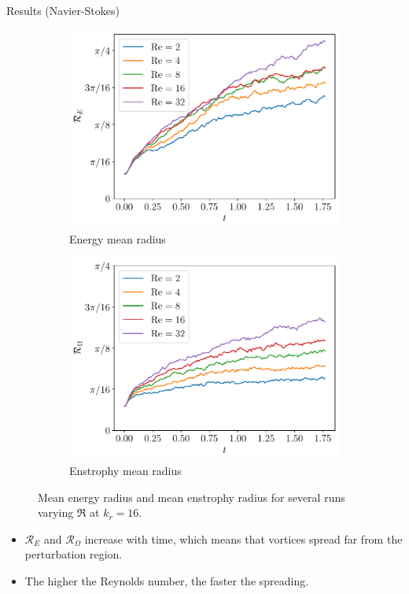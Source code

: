 \documentclass{beamer} %
\begin{document}
\begin{frame}{Results (Navier-Stokes)}
	\begin{figure}[ht]
		\centering
		\begin{subfigure}{0.44\textwidth}
			\centering
			\includegraphics[width=\textwidth]{../images/EnergyMeanRadius_Re.kdn16.pdf}
			\caption{Energy mean radius}
		\end{subfigure}\hspace{0.04\textwidth}
		\begin{subfigure}{0.44\textwidth}
			\centering
			\includegraphics[width=\textwidth]{../images/EnstrophyMeanRadius_Re.kdn16.pdf}
			\caption{Enstrophy mean radius}
		\end{subfigure}
		\caption{Mean energy radius and mean enstrophy radius for several runs varying $\Re$ at $k_r=16$.}
	\end{figure}
	\begin{itemize}
		\item $\mathcal{R}_E$ and $\mathcal{R}_\Omega$ increase with time, which means that vortices spread far from the perturbation region.
		\item The higher the Reynolds number, the faster the spreading.
	\end{itemize}
\end{frame}
\end{document}
